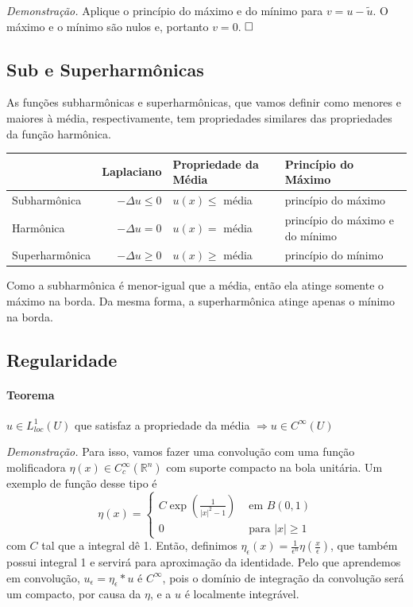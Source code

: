\documentclass[11pt]{article}
\newcommand{\qed}{$\hfill\square$}
\newcommand{\Rn}{{\mathbb{R}^n}}
\newcommand{\e}{\epsilon}
\begin{document}
\textit{Demonstração.} Aplique o princípio do máximo e do mínimo para \( v = u - \tilde{u} \). O máximo e o mínimo são nulos e, portanto \( v=0 \). \qed

\subsection{Sub e Superharmônicas}

As funções subharmônicas e superharmônicas, que vamos definir como menores e maiores à média, respectivamente, tem propriedades similares das propriedades da função harmônica.

\begin{tabular}{l r l l}
	& Laplaciano & Propriedade da Média & Princípio do Máximo \\\hline 
	\rule{0pt}{5mm}Subharmônica & \( -\Delta u \leq 0 \) & \( u(x) \leq \) média & princípio do máximo\\
	Harmônica & \( -\Delta u =0 \) & \( u(x) =  \) média & princípio do máximo  e do mínimo \\
	Superharmônica & \( -\Delta u \geq 0  \) & \( u(x) \geq  \) média & princípio do mínimo \\ \hline 
\end{tabular}

Como a subharmônica é menor-igual que a média, então ela atinge somente o máximo na borda. Da mesma forma, a superharmônica atinge apenas o mínimo na borda. 



\subsection{Regularidade}


\paragraph{Teorema}\( u \in L^1_{loc}(U) \) que satisfaz a propriedade da média \( \Rightarrow u \in C^\infty(U) \) 

\textit{Demonstração.} Para isso, vamos fazer uma convolução com uma função molificadora \( \eta(x) \in C^\infty_c(\Rn) \) com suporte compacto na bola unitária. Um exemplo de função desse tipo é \[ \eta(x) = \begin{cases}
	C \exp\left(\frac{1}{|x|^2-1}\right) &\text{ em } B(0, 1)\\
	0 &\text{ para } |x|\geq 1
\end{cases} \] com \( C \) tal que a integral dê 1. Então, definimos \( \eta_\e(x) = \frac{1}{\e^n}\eta\left(\frac{x}{\e}\right) \), que também possui integral 1 e servirá para aproximação da identidade. Pelo que aprendemos em convolução, \( u_\e = \eta_\e * u \) é \( C^\infty \), pois o domínio de integração da convolução será um compacto, por causa da \( \eta \), e a \( u \) é localmente integrável.
\end{document}

